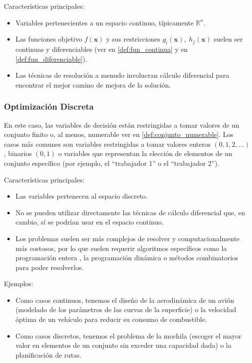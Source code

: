 \documentclass[12pt,a4paper]{book}
\begin{document}
Características principales:
\begin{itemize}
    \item Variables pertenecientes a un espacio continuo, típicamente $\mathbb{R}^n$.
    \item Las funciones objetivo $f(\mathbf{x})$ y sus restricciones $g_i(\mathbf{x}), \;h_j(\mathbf{x})$ suelen ser continuas y diferenciables (ver en \ref{def:fun_continua} y en \ref{def:fun_diferenciable}).
    \item Las técnicas de resolución a menudo involucran cálculo diferencial para encontrar el mejor camino de mejora de la solución.
\end{itemize}

\subsubsection{Optimización Discreta}
En este caso, las variables de decisión están restringidas a tomar valores de un conjunto finito o, al menos, numerable {ver en \ref{def:conjunto_numerable}}. Los casos más comunes son variables restringidas a tomar valores enteros $(0,1,2,...)$, binarios $(0,1)$ o variables que representan la elección de elementos de un conjunto específico (por ejemplo, el ``trabajador 1'' o el ``trabajador 2'').

Características principales:
\begin{itemize}
    \item Las variables pertenecen al espacio discreto.
    \item No se pueden utilizar directamente las técnicas de cálculo diferencial que, en cambio, sí se podrían usar en el espacio continuo.
    \item Los problemas suelen ser más complejos de resolver y computacionalmente más costosos, por lo que suelen requerir algoritmos específicos como la programación entera \cite{int_programing}, la programación dinámica o métodos combinatorios para poder resolverlos.
\end{itemize}

Ejemplos:
\begin{itemize}
    \item Como casos continuos, tenemos el diseño de la aerodinámica de un avión (modelado de los parámetros de las curvas de la superficie) o la velocidad óptima de un vehículo para reducir su consumo de combustible.
    \item Como casos discretos, tenemos el problema de la mochila (escoger el mayor valor en elementos de un conjunto sin exceder una capacidad dada) o la planificación de rutas.
\end{itemize}
\end{document}
